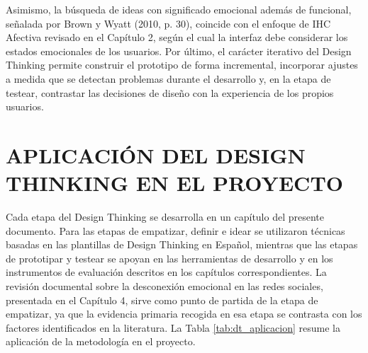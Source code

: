 Asimismo, la búsqueda de ideas con significado emocional además de funcional, señalada por Brown y Wyatt (2010, p. 30), coincide con el enfoque de IHC Afectiva revisado en el Capítulo 2, según el cual la interfaz debe considerar los estados emocionales de los usuarios. Por último, el carácter iterativo del Design Thinking permite construir el prototipo de forma incremental, incorporar ajustes a medida que se detectan problemas durante el desarrollo y, en la etapa de testear, contrastar las decisiones de diseño con la experiencia de los propios usuarios.

\section{APLICACIÓN DEL DESIGN THINKING EN EL PROYECTO}
Cada etapa del Design Thinking se desarrolla en un capítulo del presente documento. Para las etapas de empatizar, definir e idear se utilizaron técnicas basadas en las plantillas de Design Thinking en Español, mientras que las etapas de prototipar y testear se apoyan en las herramientas de desarrollo y en los instrumentos de evaluación descritos en los capítulos correspondientes. La revisión documental sobre la desconexión emocional en las redes sociales, presentada en el Capítulo 4, sirve como punto de partida de la etapa de empatizar, ya que la evidencia primaria recogida en esa etapa se contrasta con los factores identificados en la literatura. La Tabla \ref{tab:dt_aplicacion} resume la aplicación de la metodología en el proyecto.

